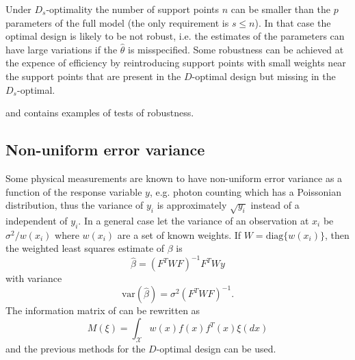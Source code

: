 \documentclass[12pt]{iopart}
\begin{document}
Under $D_s$-optimality the number of support points $n$ can be smaller than the $p$ parameters of the full model (the only requirement is $s \leq n$). In that case the optimal design is likely to be not robust, i.e. the estimates of the parameters can have large variations if the $\hat \theta$ is misspecified. Some robustness can be achieved at the expence of efficiency by reintroducing support points with small weights near the support points that are present in the $D$-optimal design but missing in the $D_s$-optimal.

 and  contains examples of tests of robustness.

\subsection{Non-uniform error variance}

Some physical measurements are known to have non-uniform error variance as a function of the response variable $y$, e.g. photon counting which has a Poissonian distribution, thus the variance of $y_i$ is approximately $\sqrt{y_i}$ instead of a independent of $y_i$. In a general case let the variance of an observation at $x_i$ be $\sigma^2/w(x_i)$ where $w(x_i)$ are a set of known weights. If $W = \mathrm{diag}\{w(x_i)\}$, then the weighted least squares estimate of $\beta$ is
\begin{equation}
\hat \beta = (F^T W F)^{-1} F^T W y
\end{equation}
with variance
\begin{equation}
\mathrm{var}(\hat \beta) = \sigma^2 (F^T W F)^{-1}.
\end{equation}
The information matrix of  can be rewritten as
\begin{equation}
M(\xi) = \int_{\mathcal{X}} w(x) f(x)f^T(x) \xi(dx)
\end{equation}
and the previous methods for the $D$-optimal design can be used.
\end{document}
